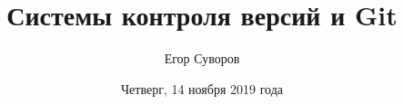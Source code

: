 \documentclass[utf8,xcolor=table]{beamer}
\title[Git]{Системы контроля версий и Git}
\author{Егор Суворов}
\institute[НИУ ВШЭ]{Курс <<Основы программирования>>}
\date[14.11.2019]{Четверг, 14 ноября 2019 года}
\begin{document}
\begin{frame}
\titlepage
\end{frame}



\end{document}
